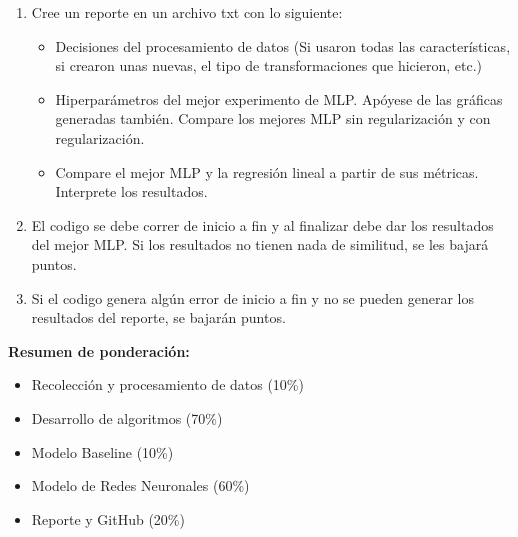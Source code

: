 \documentclass[12pt,a4paper]{article}
\begin{document}
\begin{enumerate}
\item Cree un reporte en un archivo txt con lo siguiente:
\begin{itemize}
  \item Decisiones del procesamiento de datos (Si usaron todas las características, si crearon unas nuevas, el tipo de transformaciones que hicieron, etc.)
  \item Hiperparámetros del mejor experimento de MLP. Apóyese de las gráficas generadas también. Compare los mejores MLP sin regularización y con regularización.
  \item Compare el mejor MLP y la regresión lineal a partir de sus métricas. Interprete los resultados.
\end{itemize}
\item El codigo se debe correr de inicio a fin y al finalizar debe dar los resultados del mejor MLP. Si los resultados no tienen nada de similitud, se les bajará puntos.
\item Si el codigo genera algún error de inicio a fin y no se pueden generar los resultados del reporte, se bajarán puntos.
\end{enumerate}

\bigskip
\noindent
\textbf{Resumen de ponderación:}
\begin{itemize}[label=--]
\item Recolección y procesamiento de datos (10\%)
\item Desarrollo de algoritmos (70\%)
\item Modelo Baseline (10\%)
\item Modelo de Redes Neuronales (60\%)
\item Reporte y GitHub (20\%)
\end{itemize}
\end{document}
